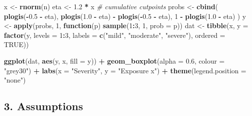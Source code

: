 \documentclass[
]{article}
\newenvironment{Shaded}{\begin{snugshade}}{\end{snugshade}}
\newcommand{\AttributeTok}[1]{\textcolor[rgb]{0.13,0.29,0.53}{#1}}
\newcommand{\CommentTok}[1]{\textcolor[rgb]{0.56,0.35,0.01}{\textit{#1}}}
\newcommand{\ConstantTok}[1]{\textcolor[rgb]{0.56,0.35,0.01}{#1}}
\newcommand{\ControlFlowTok}[1]{\textcolor[rgb]{0.13,0.29,0.53}{\textbf{#1}}}
\newcommand{\DecValTok}[1]{\textcolor[rgb]{0.00,0.00,0.81}{#1}}
\newcommand{\FloatTok}[1]{\textcolor[rgb]{0.00,0.00,0.81}{#1}}
\newcommand{\FunctionTok}[1]{\textcolor[rgb]{0.13,0.29,0.53}{\textbf{#1}}}
\newcommand{\NormalTok}[1]{#1}
\newcommand{\OtherTok}[1]{\textcolor[rgb]{0.56,0.35,0.01}{#1}}
\newcommand{\SpecialCharTok}[1]{\textcolor[rgb]{0.81,0.36,0.00}{\textbf{#1}}}
\newcommand{\StringTok}[1]{\textcolor[rgb]{0.31,0.60,0.02}{#1}}
\begin{document}
\begin{Shaded}
\begin{Highlighting}[]
\NormalTok{x }\OtherTok{\textless{}{-}} \FunctionTok{rnorm}\NormalTok{(n)}
\NormalTok{eta }\OtherTok{\textless{}{-}} \FloatTok{1.2} \SpecialCharTok{*}\NormalTok{ x}
\CommentTok{\# cumulative cutpoints}
\NormalTok{probs }\OtherTok{\textless{}{-}} \FunctionTok{cbind}\NormalTok{(}
  \FunctionTok{plogis}\NormalTok{(}\SpecialCharTok{{-}}\FloatTok{0.5} \SpecialCharTok{{-}}\NormalTok{ eta),}
  \FunctionTok{plogis}\NormalTok{(}\FloatTok{1.0} \SpecialCharTok{{-}}\NormalTok{ eta) }\SpecialCharTok{{-}} \FunctionTok{plogis}\NormalTok{(}\SpecialCharTok{{-}}\FloatTok{0.5} \SpecialCharTok{{-}}\NormalTok{ eta),}
  \DecValTok{1} \SpecialCharTok{{-}} \FunctionTok{plogis}\NormalTok{(}\FloatTok{1.0} \SpecialCharTok{{-}}\NormalTok{ eta)}
\NormalTok{)}
\NormalTok{y }\OtherTok{\textless{}{-}} \FunctionTok{apply}\NormalTok{(probs, }\DecValTok{1}\NormalTok{, }\ControlFlowTok{function}\NormalTok{(p) }\FunctionTok{sample}\NormalTok{(}\DecValTok{1}\SpecialCharTok{:}\DecValTok{3}\NormalTok{, }\DecValTok{1}\NormalTok{, }\AttributeTok{prob =}\NormalTok{ p))}
\NormalTok{dat }\OtherTok{\textless{}{-}} \FunctionTok{tibble}\NormalTok{(x, }\AttributeTok{y =} \FunctionTok{factor}\NormalTok{(y, }\AttributeTok{levels =} \DecValTok{1}\SpecialCharTok{:}\DecValTok{3}\NormalTok{,}
                            \AttributeTok{labels =} \FunctionTok{c}\NormalTok{(}\StringTok{"mild"}\NormalTok{, }\StringTok{"moderate"}\NormalTok{, }\StringTok{"severe"}\NormalTok{),}
                            \AttributeTok{ordered =} \ConstantTok{TRUE}\NormalTok{))}

\FunctionTok{ggplot}\NormalTok{(dat, }\FunctionTok{aes}\NormalTok{(y, x, }\AttributeTok{fill =}\NormalTok{ y)) }\SpecialCharTok{+}
  \FunctionTok{geom\_boxplot}\NormalTok{(}\AttributeTok{alpha =} \FloatTok{0.6}\NormalTok{, }\AttributeTok{colour =} \StringTok{"grey30"}\NormalTok{) }\SpecialCharTok{+}
  \FunctionTok{labs}\NormalTok{(}\AttributeTok{x =} \StringTok{"Severity"}\NormalTok{, }\AttributeTok{y =} \StringTok{"Exposure x"}\NormalTok{) }\SpecialCharTok{+}
  \FunctionTok{theme}\NormalTok{(}\AttributeTok{legend.position =} \StringTok{"none"}\NormalTok{)}
\end{Highlighting}
\end{Shaded}

\subsection{3. Assumptions}\label{assumptions}
\end{document}
